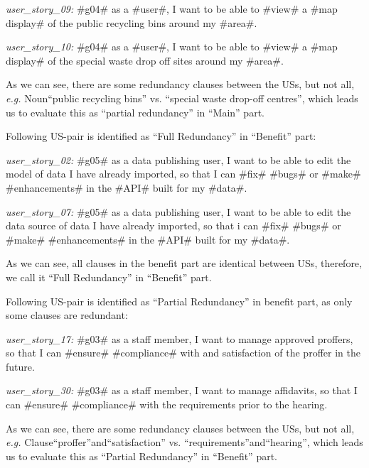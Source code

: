 \begin{itemize}
\begin{example}
		\textit{user\_story\_09:} \#g04\# as a \#user\#, I want to be able to \#view\# a \#map display\# of the public recycling bins around my \#area\#.
		
		\textit{user\_story\_10:} \#g04\# as a \#user\#, I want to be able to \#view\# a \#map display\# of the special waste drop off sites around my \#area\#.
		
		As we can see, there are some redundancy clauses between the USs, but not all, \textit{e.g.} Noun\enquote{public recycling bins} vs. \enquote{special waste drop-off centres}, which leads us to evaluate this as \enquote{partial redundancy} in \enquote{Main} part.
	\end{example}
	\begin{example}
		Following US-pair is identified as \enquote{Full Redundancy} in \enquote{Benefit} part:
		
		\textit{user\_story\_02:} \#g05\# as a data publishing user, I want to be able to edit the model of data I have already imported, so that I can \#fix\# \#bugs\# or \#make\# \#enhancements\# in the \#API\# built for my \#data\#.
		
		\textit{user\_story\_07:} \#g05\# as a data publishing user, I want to be able to edit the data source of data I have already imported, so that i can \#fix\# \#bugs\# or \#make\# \#enhancements\# in the \#API\# built for my \#data\#.
		
		As we can see, all clauses in the benefit part are identical between USs, therefore, we call it \enquote{Full Redundancy} in \enquote{Benefit} part.
	\end{example}
	\begin{example}
	Following US-pair is identified as \enquote{Partial Redundancy} in benefit part, as only some clauses are redundant:
	
	\textit{user\_story\_17:} \#g03\# as a staff member, I want to manage approved proffers, so that I can \#ensure\# \#compliance\# with and satisfaction of the proffer in the future.
	
	\textit{user\_story\_30:} \#g03\# as a staff member, I want to manage affidavits, so that I can \#ensure\# \#compliance\# with the requirements prior to the hearing.
	
	As we can see, there are some redundancy clauses between the USs, but not all, \textit{e.g.} Clause\enquote{proffer}and\enquote{satisfaction} vs. \enquote{requirements}and\enquote{hearing}, which leads us to evaluate this as \enquote{Partial Redundancy} in \enquote{Benefit} part.
	\end{example} 
	
\end{itemize}
